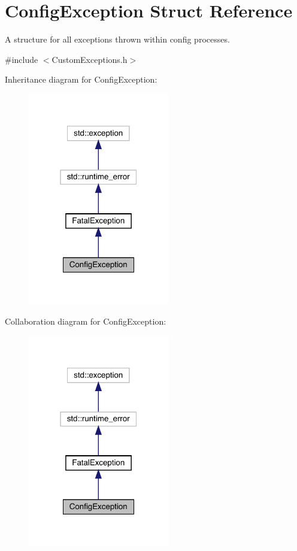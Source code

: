 \hypertarget{struct_config_exception}{}\section{Config\+Exception Struct Reference}
\label{struct_config_exception}


A structure for all exceptions thrown within config processes.  




{\ttfamily \#include $<$Custom\+Exceptions.\+h$>$}



Inheritance diagram for Config\+Exception\+:\nopagebreak
\begin{figure}[H]
\begin{center}
\leavevmode
\includegraphics[width=175pt]{struct_config_exception__inherit__graph}
\end{center}
\end{figure}


Collaboration diagram for Config\+Exception\+:\nopagebreak
\begin{figure}[H]
\begin{center}
\leavevmode
\includegraphics[width=175pt]{struct_config_exception__coll__graph}
\end{center}
\end{figure}
